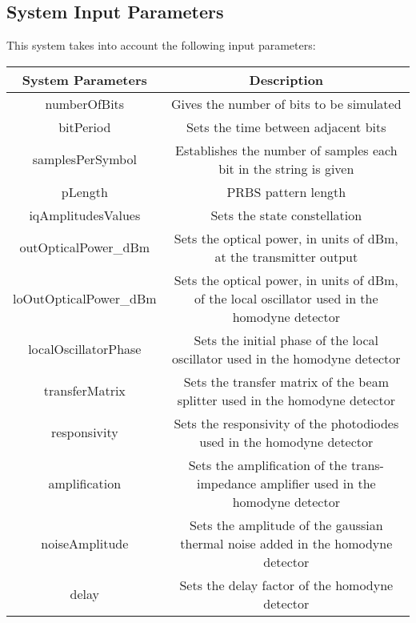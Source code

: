 \subsection*{System Input Parameters}

This system takes into account the following input parameters:

\begin{table}[H]
\centering
\begin{tabulary}{1.0\textwidth}{|C|C|}
\hline
\textbf{System Parameters} & \textbf{Description} 																 \\ \hline
numberOfBits               & Gives the number of bits to be simulated		          										 \\ \hline
bitPeriod                  & Sets the time between adjacent bits                                                           \\ \hline
samplesPerSymbol           & Establishes the number of samples each bit in the string is given 	         \\ \hline
pLength                    & PRBS pattern length					                      									 \\ \hline
iqAmplitudesValues         & Sets the state constellation																	 \\ \hline
outOpticalPower\_dBm       & Sets the optical power, in units of dBm, at the transmitter output							 \\ \hline
loOutOpticalPower\_dBm     & Sets the optical power, in units of dBm, of the local oscillator used in the homodyne detector \\ \hline
localOscillatorPhase       & Sets the initial phase of the local oscillator used in the homodyne detector					 \\ \hline
transferMatrix             & Sets the transfer matrix of the beam splitter used in the homodyne detector					 \\ \hline
responsivity               & Sets the responsivity of the photodiodes used in the homodyne detector						 \\ \hline
amplification              & Sets the amplification of the trans-impedance amplifier used in the homodyne detector			 \\ \hline
noiseAmplitude             & Sets the amplitude of the gaussian thermal noise added in the homodyne detector				 \\ \hline
delay                      & Sets the delay factor of the homodyne detector												 \\ \hline

\end{tabulary}
\end{table}
